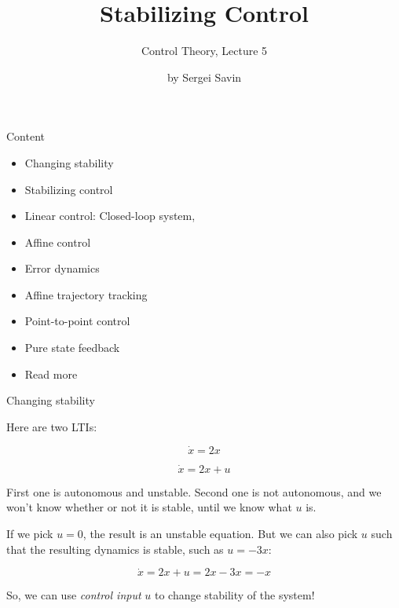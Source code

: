 \documentclass{beamer}
\title{Stabilizing Control}
\subtitle{Control Theory, Lecture 5}
\author{by Sergei Savin}
\date{\mydate}
\begin{document}
\maketitle


\begin{frame}{Content}

\begin{itemize}
\item Changing stability
\item Stabilizing control
\item Linear control: Closed-loop system, 
\item Affine control
\item Error dynamics
\item Affine trajectory tracking
\item Point-to-point control
\item Pure state feedback
\item Read more
\end{itemize}

\end{frame}



\begin{frame}{Changing stability}
\begin{flushleft}

Here are two LTIs:

\begin{equation}
    \dot{x} = 2 x
\end{equation}

\begin{equation}
    \dot{x} = 2 x + u
\end{equation}

First one is autonomous and unstable. Second one is not autonomous, and we won't know whether or not it is stable, until we know what $u$ is.

\bigskip

If we pick $u=0$, the result is an unstable equation. But we can also pick $u$ such that the resulting dynamics is stable, such as $u=-3x$:

\begin{equation}
    \dot{x} = 2 x + u = 2 x - 3x = -x
\end{equation}

\begin{block}{ }
So, we can use \emph{control input} $u$ to change stability of the system!
\end{block}


\end{flushleft}
\end{frame}
\end{document}
